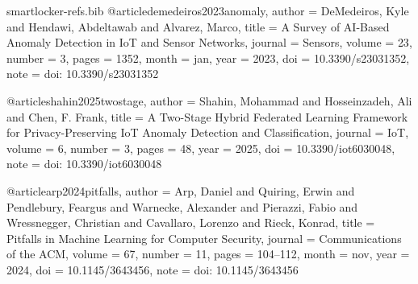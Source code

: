 \begin{filecontents*}[overwrite]{smartlocker-refs.bib}
@article{demedeiros2023anomaly,
  author  = {DeMedeiros, Kyle and Hendawi, Abdeltawab and Alvarez, Marco},
  title   = {A Survey of {AI}-Based Anomaly Detection in {IoT} and Sensor Networks},
  journal = {Sensors},
  volume  = {23},
  number  = {3},
  pages   = {1352},
  month   = jan,
  year    = {2023},
  doi     = {10.3390/s23031352},
  note    = {doi: 10.3390/s23031352}
}

@article{shahin2025twostage,
  author  = {Shahin, Mohammad and Hosseinzadeh, Ali and Chen, F. Frank},
  title   = {A Two-Stage Hybrid Federated Learning Framework for Privacy-Preserving {IoT} Anomaly Detection and Classification},
  journal = {IoT},
  volume  = {6},
  number  = {3},
  pages   = {48},
  year    = {2025},
  doi     = {10.3390/iot6030048},
  note    = {doi: 10.3390/iot6030048}
}

@article{arp2024pitfalls,
  author  = {Arp, Daniel and Quiring, Erwin and Pendlebury, Feargus and Warnecke, Alexander and Pierazzi, Fabio and Wressnegger, Christian and Cavallaro, Lorenzo and Rieck, Konrad},
  title   = {Pitfalls in Machine Learning for Computer Security},
  journal = {Communications of the ACM},
  volume  = {67},
  number  = {11},
  pages   = {104--112},
  month   = nov,
  year    = {2024},
  doi     = {10.1145/3643456},
  note    = {doi: 10.1145/3643456}
}
\end{filecontents*}

\documentclass[journal,onecolumn]{IEEEtran}
\usepackage{cite}
\usepackage{amsmath,amssymb,amsfonts}
\usepackage{graphicx}
\usepackage{textcomp}
\usepackage{float}
\usepackage{etoolbox}
\usepackage{multicol}
\usepackage{array}
\usepackage{iftex}
\usepackage{iftex}
\ifPDFTeX\else
  \usepackage{fontspec}
  \setmainfont{texgyretermes}[Extension=.otf, UprightFont=*-regular, BoldFont=*-bold,
    ItalicFont=*-italic, BoldItalicFont=*-bolditalic]
  \setsansfont{texgyreheros}[Extension=.otf, UprightFont=*-regular, BoldFont=*-bold,
    ItalicFont=*-italic, BoldItalicFont=*-bolditalic]
  \setmonofont{texgyrecursor}[Extension=.otf, UprightFont=*-regular, BoldFont=*-bold,
    ItalicFont=*-italic, BoldItalicFont=*-bolditalic]
\fi
\usepackage{tikz}
\usetikzlibrary{arrows.meta,positioning,fit,shapes.geometric,calc,backgrounds}

